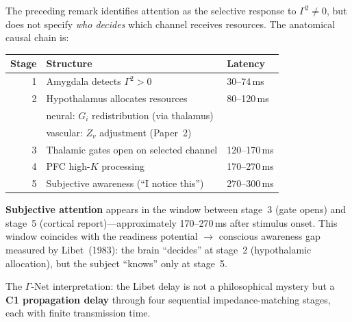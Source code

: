 \documentclass[aps,pre,twocolumn,superscriptaddress,floatfix]{revtex4-2}
\begin{document}
\begin{remark}
\label{rem:subjective-attention}
The preceding remark identifies attention as the
selective response to $\Gamma^2 \neq 0$, but does
not specify \emph{who decides} which channel receives
resources.  The anatomical causal chain is:
\begin{center}
\begin{tabular}{rll}
\toprule
Stage & Structure & Latency \\
\midrule
1 & Amygdala detects $\Gamma^2 > 0$ & 30--74\,ms \\
2 & Hypothalamus allocates resources & 80--120\,ms \\
  & \quad neural: $G_i$ redistribution (via thalamus) & \\
  & \quad vascular: $Z_v$ adjustment (Paper~2) & \\
3 & Thalamic gates open on selected channel & 120--170\,ms \\
4 & PFC high-$K$ processing & 170--270\,ms \\
5 & Subjective awareness (``I notice this'') & 270--300\,ms \\
\bottomrule
\end{tabular}
\end{center}
\textbf{Subjective attention} appears in the window
between stage~3 (gate opens) and stage~5 (cortical
report)---approximately 170--270\,ms after stimulus
onset.  This window coincides with the
readiness potential $\to$ conscious awareness gap
measured by Libet~(1983): the brain ``decides'' at
stage~2 (hypothalamic allocation), but the subject
``knows'' only at stage~5.

The $\Gamma$-Net interpretation: the Libet delay is
not a philosophical mystery but a \textbf{C1
propagation delay} through four sequential
impedance-matching stages, each with finite
transmission time.
\end{remark}
\end{document}
